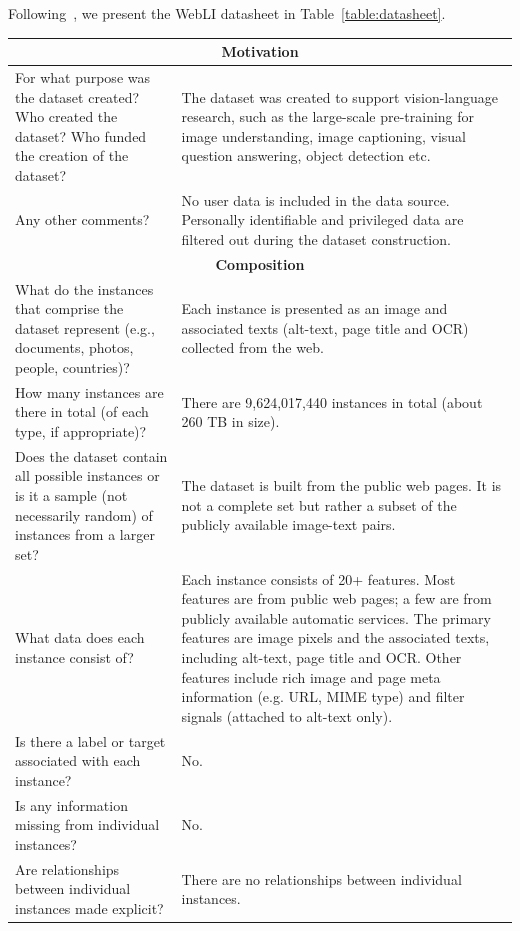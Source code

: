 Following~\cite{gebru2021datasheets}, we present the WebLI datasheet in Table~\ref{table:datasheet}. 

\begin{longtable}[c]{ p{} | p{} } 
\toprule
\multicolumn{2}{c}{\textbf{Motivation}}      \\ \toprule
For what purpose was the dataset created? Who created the dataset? Who funded the creation of the dataset? & The dataset was created to support vision-language research, such as the large-scale pre-training for image understanding, image captioning, visual question answering, object detection etc. \\ \midrule
Any other comments? & No user data is included in the data source. Personally identifiable and privileged data are filtered out during the dataset construction. \\ \midrule
\multicolumn{2}{c}{\textbf{Composition}}      \\ \toprule
What do the instances that comprise the dataset represent (e.g., documents, photos, people, countries)? & Each instance is presented as an image and associated texts (alt-text, page title and OCR) collected from the web.
 \\ \midrule
How many instances are there in total (of each type, if appropriate)? & There are 9,624,017,440 instances in total (about 260 TB in size). \\ \midrule
Does the dataset contain all possible instances or is it a sample (not necessarily random) of instances from a larger set? & The dataset is built from the public web pages. It is not a complete set but rather a subset of the publicly available image-text pairs. \\ \midrule
What data does each instance consist of? & Each instance consists of 20+ features. Most features are from public web pages; a few are from publicly available automatic services. The primary features are image pixels and the associated texts, including alt-text, page title and OCR. Other features include rich image and page meta information (e.g. URL, MIME type) and filter signals (attached to alt-text only). \\ \midrule
Is there a label or target associated with each instance? & No. \\ \midrule
Is any information missing from individual instances? & No. \\ \midrule
Are relationships between individual instances made explicit? & There are no relationships between individual instances. \\ \midrule

\end{longtable}
